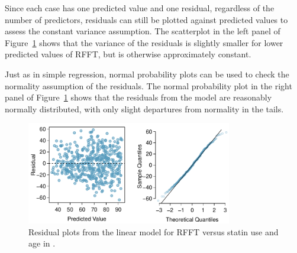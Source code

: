 \textD{\newpage}

Since each case has one predicted value and one residual, regardless of the number of predictors, residuals can still be plotted against predicted values to assess the constant variance assumption. The scatterplot in the left panel of Figure~\ref{prevendStatinAgeResidNormPlot} shows that the variance of the residuals is slightly smaller for lower predicted values of RFFT, but is otherwise approximately constant.


Just as in simple regression, normal probability plots can be used to check the normality assumption of the residuals. The normal probability plot in the right panel of Figure~\ref{prevendStatinAgeResidNormPlot} shows that the residuals from the model are reasonably normally distributed, with only slight departures from normality in the tails.

\begin{figure}[h]
	\centering
	\includegraphics[width=0.8\textwidth]
	{ch_multiple_linear_regression_oi_biostat/figures/prevendStatinAgeResidNormPlot/prevendStatinAgeResidNormPlot.pdf}
	\caption{Residual plots from the linear model for RFFT versus statin use and age in .}
	\label{prevendStatinAgeResidNormPlot}
\end{figure}


